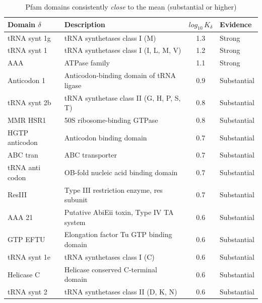 \documentclass[12pt]{article}
\begin{document}
\begin{table}[!h]
	\centering
	\hspace*{-1.2cm}
    \begin{tabular}{l l c l}
        \toprule
        Domain $\delta$ & Description & $log_{10}\,K_{\delta}$ & Evidence \\
        \midrule
        tRNA synt 1g & tRNA synthetases class I (M) & 1.3 & Strong \\
        tRNA synt 1 & tRNA synthetases class I (I, L, M, V) & 1.2 & Strong \\
        AAA & ATPase family & 1.1 & Strong \\
        Anticodon 1 & Anticodon-binding domain of tRNA ligase & 0.9 & Substantial \\
        tRNA synt 2b & tRNA synthetase class II (G, H, P, S, T) & 0.8 & Substantial \\
        MMR HSR1 & 50S ribosome-binding GTPase & 0.8 & Substantial \\
        HGTP anticodon & Anticodon binding domain & 0.7 & Substantial \\
        ABC tran & ABC transporter & 0.7 & Substantial \\
        tRNA anti codon & OB-fold nucleic acid binding domain & 0.7 & Substantial \\
        ResIII & Type III restriction enzyme, res subunit & 0.7 & Substantial \\
        AAA 21 & Putative AbiEii toxin, Type IV TA system & 0.6 & Substantial \\
        GTP EFTU & Elongation factor Tu GTP binding domain & 0.6 & Substantial \\
        tRNA synt 1e & tRNA synthetases class I (C) & 0.6 & Substantial \\
        Helicase C & Helicase conserved C-terminal domain & 0.6 & Substantial \\
        tRNA synt 2 & tRNA synthetases class II (D, K, N) & 0.6 & Substantial \\
        \bottomrule
    \end{tabular}
    \caption{Pfam domains consistently \textit{close} to the mean (substantial or higher)}
    \label{table:pfam_left_overall}
\end{table}
\end{document}
